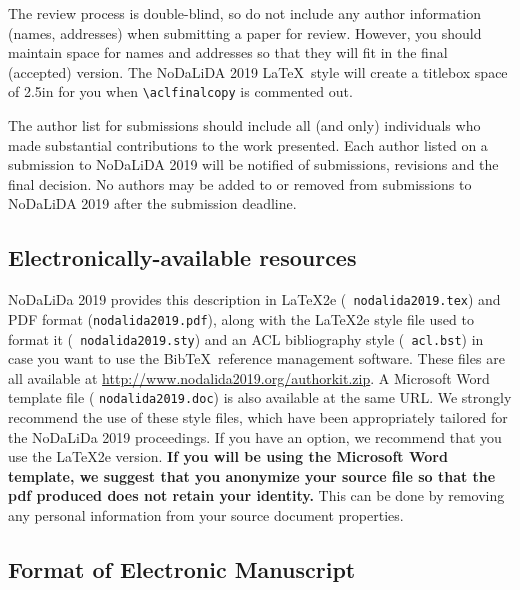 \documentclass[11pt]{article}
\begin{document}
The review process is double-blind, so do not include any author information (names, addresses) when submitting a paper for review.  
However, you should maintain space for names and addresses so that they will fit in the final (accepted) version.  The NoDaLiDA 2019 \LaTeX\ style will create a titlebox space of 2.5in for you when {\small\verb|\aclfinalcopy|} is commented out.  

The author list for submissions should include all (and only) individuals who made substantial contributions to the work presented. Each author listed on a submission to NoDaLiDA 2019 will be notified of submissions, revisions and the final decision. No authors may be added to or removed from submissions to NoDaLiDA 2019 after the submission deadline.

\subsection{Electronically-available resources}

NoDaLiDa 2019 provides this description in \LaTeX2e ({\small {\tt
    nodalida2019.tex}}) and PDF format ({\small {\tt nodalida2019.pdf}}),
along with the \LaTeX2e style file used to format it ({\small {\tt
    nodalida2019.sty}}) and an ACL bibliography style ({\small {\tt
    acl.bst}}) in case you want to use the Bib\TeX\ reference management
software. These files are all available at
\url{http://www.nodalida2019.org/authorkit.zip}. A Microsoft Word template file ({\small
  {\tt nodalida2019.doc}}) is also available at the same URL. We strongly
recommend the use of these style files, which have been appropriately
tailored for the NoDaLiDa 2019 proceedings. If you have an option, we
recommend that you use the \LaTeX2e version. \textbf{If you will be
  using the Microsoft Word template, we suggest that you anonymize
  your source file so that the pdf produced does not retain your
  identity.}  This can be done by removing any personal information
from your source document properties.



\subsection{Format of Electronic Manuscript}
\label{sect:pdf}
\end{document}
